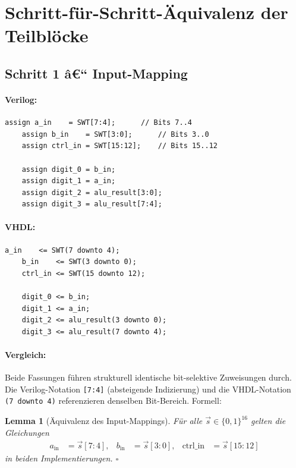 ﻿\documentclass[12pt,a4paper]{report}
\newtheorem{lemma}[theorem]{Lemma}
\begin{document}
\section{Schritt-für-Schritt-Äquivalenz der Teilblöcke}
\label{subsec:schritte}

\subsection{Schritt 1 â€“ Input-Mapping}
\label{sssec:input_mapping}

\paragraph{Verilog:}
\begin{lstlisting}[style=hdlstyle, caption={Input-Mapping in Verilog}]
	assign a_in    = SWT[7:4];      // Bits 7..4
	assign b_in    = SWT[3:0];      // Bits 3..0
	assign ctrl_in = SWT[15:12];    // Bits 15..12
	
	assign digit_0 = b_in;
	assign digit_1 = a_in;
	assign digit_2 = alu_result[3:0];
	assign digit_3 = alu_result[7:4];
\end{lstlisting}

\paragraph{VHDL:}
\begin{lstlisting}[style=hdlstyle, caption={Input-Mapping in VHDL}]
	a_in    <= SWT(7 downto 4);
	b_in    <= SWT(3 downto 0);
	ctrl_in <= SWT(15 downto 12);
	
	digit_0 <= b_in;
	digit_1 <= a_in;
	digit_2 <= alu_result(3 downto 0);
	digit_3 <= alu_result(7 downto 4);
\end{lstlisting}

\paragraph{Vergleich:}
Beide Fassungen führen strukturell identische bit-selektive Zuweisungen durch.
Die Verilog-Notation \texttt{[7:4]} (absteigende Indizierung) und die
VHDL-Notation \texttt{(7~downto~4)} referenzieren denselben Bit-Bereich.
Formell:

\begin{lemma}[Äquivalenz des Input-Mappings]
	\label{lem:input_mapping}
	Für alle $\vec{s} \in \{0,1\}^{16}$ gelten die Gleichungen
	\begin{align*}
		a_\mathrm{in} &= \vec{s}[7{:}4], &
		b_\mathrm{in} &= \vec{s}[3{:}0], &
		\mathrm{ctrl\_in} &= \vec{s}[15{:}12]
	\end{align*}
	in beiden Implementierungen.  \hfill $\square$
\end{lemma}
\end{document}
